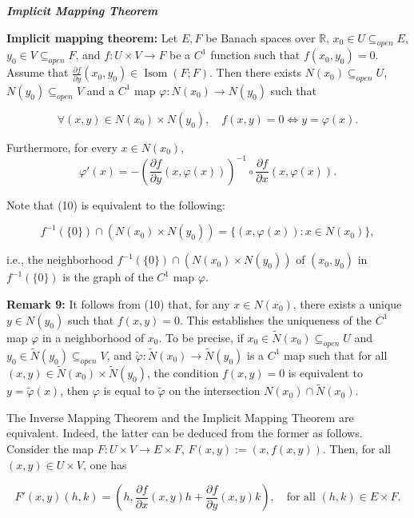 \documentclass{book}
\begin{document}
\begin{center}
    \textbf{\textit{Implicit Mapping Theorem}}
\end{center}

\textbf{Implicit mapping theorem:} Let $E, F$ be Banach spaces over $\mathbb{R}$, $x_0 \in U \subseteq_{open} E$, $y_0 \in V \subseteq_{open} F$, and $f : U \times V \to F$ be a $C^1$ function such that $f(x_0, y_0) = 0$. Assume that $\frac{\partial f}{\partial y}(x_0, y_0) \in \operatorname{Isom}(F; F)$. Then there exists $N(x_0) \subseteq_{open} U$, $N(y_0) \subseteq_{open} V$ and a $C^1$ map $\varphi : N(x_0) \to N(y_0)$ such that

\[
\forall (x, y) \in N(x_0) \times N(y_0), \quad f(x, y) = 0 \Longleftrightarrow y = \varphi(x).
\tag{10}
\]

Furthermore, for every $x \in N(x_0)$,
\[
\varphi'(x) = - \left( \frac{\partial f}{\partial y}(x, \varphi(x)) \right)^{-1} \circ \frac{\partial f}{\partial x}(x, \varphi(x)).
\]

Note that (10) is equivalent to the following:

\[
f^{-1}(\{0\}) \cap (N(x_0) \times N(y_0)) = \{(x, \varphi(x)) : x \in N(x_0)\},
\]

i.e., the neighborhood $f^{-1}(\{0\}) \cap (N(x_0) \times N(y_0))$ of $(x_0, y_0)$ in $f^{-1}(\{0\})$ is the graph of the $C^1$ map $\varphi$.

\textbf{Remark 9:} It follows from (10) that, for any $x \in N(x_0)$, there exists a unique $y \in N(y_0)$ such that $f(x, y) = 0$. This establishes the uniqueness of the $C^1$ map $\varphi$ in a neighborhood of $x_0$. To be precise, if $x_0 \in \tilde{N}(x_0) \subseteq_{open} U$ and $y_0 \in \tilde{N}(y_0) \subseteq_{open} V$, and $\tilde{\varphi} : \tilde{N}(x_0) \to \tilde{N}(y_0)$ is a $C^1$ map such that for all $(x, y) \in \tilde{N}(x_0) \times \tilde{N}(y_0)$, the condition $f(x, y) = 0$ is equivalent to $y = \tilde{\varphi}(x)$, then $\varphi$ is equal to $\tilde{\varphi}$ on the intersection $N(x_0) \cap \tilde{N}(x_0)$.

The Inverse Mapping Theorem and the Implicit Mapping Theorem are equivalent. Indeed, the latter can be deduced from the former as follows. Consider the map $F : U \times V \to E \times F$, $F(x, y) := (x, f(x, y))$. Then, for all $(x, y) \in U \times V$, one has

\[
F'(x, y)(h, k) = \left( h, \frac{\partial f}{\partial x}(x, y)h + \frac{\partial f}{\partial y}(x, y)k \right), \quad \text{for all } (h, k) \in E \times F.
\]
\end{document}
